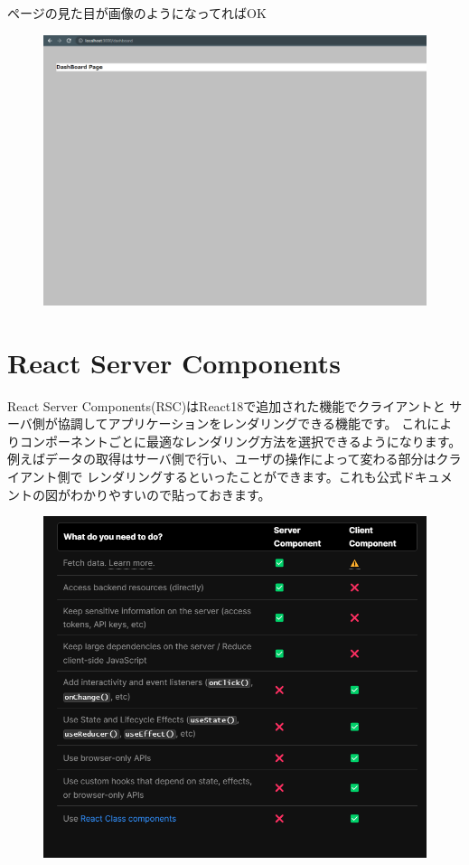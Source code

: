 ページの見た目が画像のようになってればOK


\begin{figure}[H]
  \centering
  \includegraphics[width=12cm]{./image/03-Tech/chap4/03.png}
\end{figure}










\section{React Server Components}
React Server Components(RSC)はReact18で追加された機能でクライアントと
サーバ側が協調してアプリケーションをレンダリングできる機能です。
これによりコンポーネントごとに最適なレンダリング方法を選択できるようになります。
例えばデータの取得はサーバ側で行い、ユーザの操作によって変わる部分はクライアント側で
レンダリングするといったことができます。これも公式ドキュメントの図がわかりやすいので貼っておきます。


\begin{figure}[H]
  \centering
  \includegraphics[width=12cm]{./image/03-Tech/chap4/04.png}
\end{figure}



